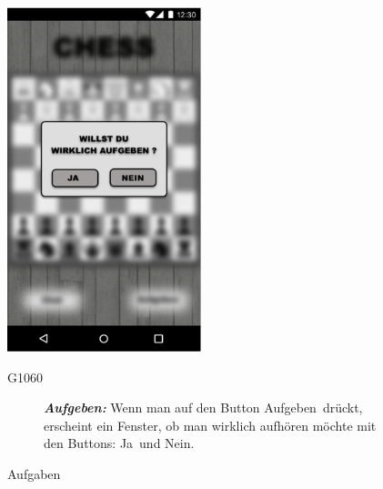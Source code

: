 \documentclass[parskip=full]{scrartcl}
\begin{document}
\begin{figure}[htp]
	\begin{minipage}[t]{6cm}
		\vspace{0pt}
		\includegraphics[height=100mm]{aufgeben.png}
		\caption{Aufgaben}
		\label{fig:Aufgeben}
	\end{minipage}
	\hfill
	\begin{minipage}[t]{6cm}
		\vspace{0pt}
		\begin{description}
			\item[G1060] \textbf{\textit{Aufgeben: }} Wenn man auf den Button \glqq Aufgeben\grqq\  drückt, erscheint ein Fenster, ob man wirklich aufhören möchte mit den Buttons: \glqq Ja\grqq\ und \glqq Nein\grqq.
		\end{description}
	\end{minipage}
\end{figure}
\end{document}
